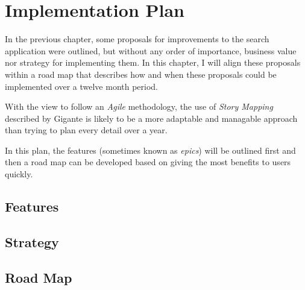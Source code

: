 \chapter{Implementation Plan}

In the previous chapter, some proposals for improvements to
the search application were outlined, but without any order
of importance, business value nor strategy for implementing them.
In this chapter, I will align these proposals within a road map
that describes how and when these proposals could be implemented
over a twelve month period.

With the view to follow an \emph{Agile} methodology, the use
of \emph{Story Mapping} described by Gigante\cite{gigante2013creating}
is likely to be a more adaptable and managable approach than
trying to plan every detail over a year.

In this plan, the features (sometimes known as \emph{epics}) will
be outlined first and then a road map can be developed based
on giving the most benefits to users quickly.

\section{Features}

\section{Strategy}

\section{Road Map}
